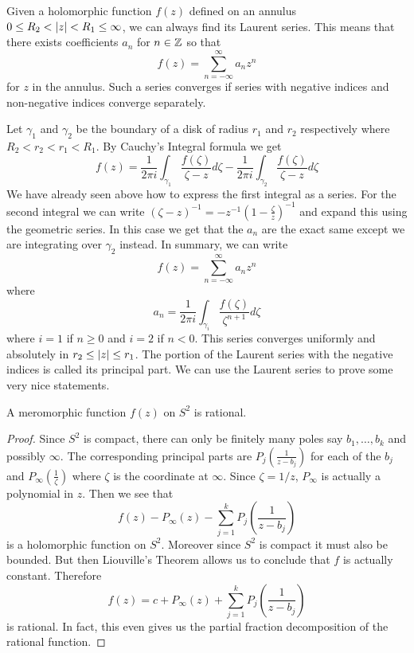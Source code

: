 Given a holomorphic function $f(z)$ defined on an annulus $0 \leq R_2 < \left|z\right| < R_1 \leq \infty$, we can always find its Laurent series. This means that there exists coefficients $a_n$ for $n \in \mathbb{Z}$ so that 
$$f(z) = \sum_{n = -\infty}^\infty a_n z^n$$
for $z$ in the annulus. Such a series converges if series with negative indices and non-negative indices converge separately. 

Let $\gamma_1$ and $\gamma_2$ be the boundary of a disk of radius $r_1$ and $r_2$ respectively where $R_2 < r_2 < r_1 < R_1$. By Cauchy's Integral formula we get
$$f(z) = \frac{1}{2\pi i} \int_{\gamma_1} \frac{f(\zeta)}{\zeta - z} d\zeta - \frac{1}{2\pi i} \int_{\gamma_2} \frac{f(\zeta)}{\zeta - z} d\zeta$$
We have already seen above how to express the first integral as a series. For the second integral we can write $(\zeta - z)^{-1} = - z^{-1}(1 - \frac{\zeta}{z})^{-1}$ and expand this using the geometric series. In this case we get that the $a_n$ are the exact same except we are integrating over $\gamma_2$ instead. In summary, we can write
$$f(z) = \sum_{n = -\infty}^{\infty} a_n z^n$$
where 
$$a_n = \frac{1}{2\pi i} \int_{\gamma_i} \frac{f(\zeta)}{\zeta^{n + 1}} d\zeta$$
where $i = 1$ if $n \geq 0$ and $i = 2$ if $n < 0$.
This series converges uniformly and absolutely in $r_2 \leq \left|z\right| \leq r_1$. The portion of the Laurent series with the negative indices is called its principal part. We can use the Laurent series to prove some very nice statements.

\begin{theorem}
A meromorphic function $f(z)$ on $S^2$ is rational.
\end{theorem}
\begin{proof}
    Since $S^2$ is compact, there can only be finitely many poles say $b_1, \dots, b_k$ and possibly $\infty$. The corresponding principal parts are $P_j(\frac{1}{z - b_j})$ for each of the $b_j$ and $P_\infty(\frac{1}{\zeta})$ where $\zeta$ is the coordinate at $\infty$. Since $\zeta = 1/z$, $P_\infty$ is actually a polynomial in $z$. Then we see that
    $$f(z) - P_\infty(z) - \sum_{j = 1}^k P_j \left( \frac{1}{z - b_j} \right)$$
    is a holomorphic function on $S^2$. Moreover since $S^2$ is compact it must also be bounded. But then Liouville's Theorem allows us to conclude that $f$ is actually constant. Therefore
    $$f(z) = c + P_{\infty}(z) + \sum_{j = 1}^k P_j \left( \frac{1}{z - b_j} \right)$$
    is rational. In fact, this even gives us the partial fraction decomposition of the rational function.
\end{proof}

